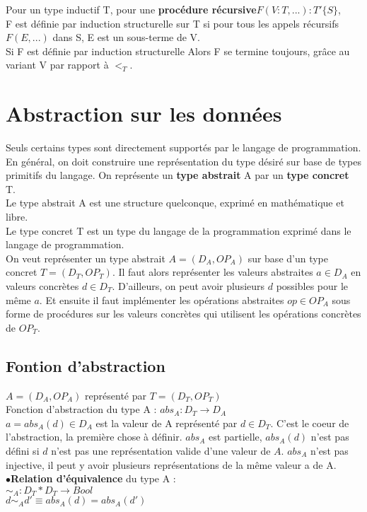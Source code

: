 Pour un type inductif T, pour une \textbf{procédure récursive}$F(V:T,...):T'\{S\}$,\\
F est définie par induction structurelle sur T si pour tous les appels récursifs $F(E,...)$ dans S, E est un sous-terme de V.\\
Si F est définie par induction structurelle Alors F se termine toujours, grâce au variant V par rapport  à $<_T$.

\section{Abstraction sur les données}
Seuls certains types sont directement supportés par le langage de programmation. En général, on doit construire une représentation du type désiré sur base de types primitifs du langage. On représente un \textbf{type abstrait} A par un \textbf{type concret} T.\\
Le type abstrait A est une structure quelconque, exprimé en mathématique et libre.\\
Le type concret T est un type du langage de la programmation exprimé dans le langage de programmation.\\
On veut représenter un type abstrait $A=(D_A,OP_A)$ sur base d'un type concret $T=(D_T,OP_T)$. Il faut alors représenter les valeurs abstraites $a \in D_A$ en valeurs concrètes $d\in D_T$. D'ailleurs, on peut avoir plusieurs $d$ possibles pour le même $a$. Et ensuite il faut implémenter les opérations abstraites $op \in OP_A$ sous forme de procédures sur les valeurs concrètes qui utilisent les opérations concrètes de $OP_T$.
\subsection{Fontion d'abstraction}
$A=(D_A,OP_A)$ représenté par $T=(D_T,OP_T)$\\
Fonction d'abstraction du type A : $abs_A:D_T \rightarrow D_A$\\
$a=abs_A(d)\in D_A$ est la valeur de A représenté par $d\in D_T$. C'est le coeur de l'abstraction, la première chose à définir. $abs_A$ est partielle, $abs_A(d)$ n'est pas défini si $d$ n'est pas une représentation valide d'une valeur de $A$. $abs_A$ n'est pas injective, il peut y avoir plusieurs représentations de la même valeur a de A.\\

$\bullet$\textbf{Relation d'équivalence} du type A :\\
$\sim_A: D_T*D_T \rightarrow Bool$\\
$d\sim_A d' \equiv abs_A(d) = abs_A(d')$\\

